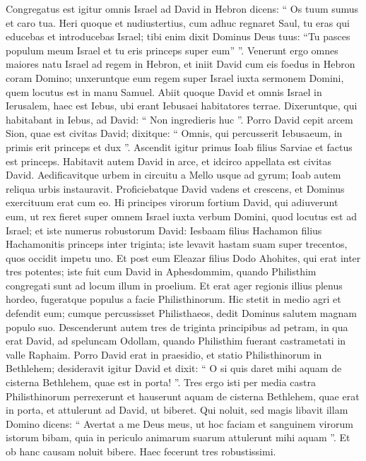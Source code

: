 \begin{biblechapter}
\begin{biblechapter}
\begin{biblechapter}
\begin{biblechapter}
\begin{biblechapter}
\begin{biblechapter}
\begin{biblechapter}
\begin{biblechapter}
\begin{biblechapter}
\begin{biblechapter}
\begin{biblechapter}
\verse Congregatus est igitur omnis Israel ad David in Hebron dicens: “ Os tuum sumus et caro tua. 
\verse Heri quoque et nudiustertius, cum adhuc regnaret Saul, tu eras qui educebas et introducebas Israel; tibi enim dixit Dominus Deus tuus: “Tu pasces populum meum Israel et tu eris princeps super eum” ”. 
\verse Venerunt ergo omnes maiores natu Israel ad regem in Hebron, et iniit David cum eis foedus in Hebron coram Domino; unxeruntque eum regem super Israel iuxta sermonem Domini, quem locutus est in manu Samuel.
 \verse Abiit quoque David et omnis Israel in Ierusalem, haec est Iebus, ubi erant Iebusaei habitatores terrae. 
\verse Dixeruntque, qui habitabant in Iebus, ad David: “ Non ingredieris huc ”. Porro David cepit arcem Sion, quae est civitas David; 
\verse dixitque: “ Omnis, qui percusserit Iebusaeum, in primis erit princeps et dux ”. Ascendit igitur primus Ioab filius Sarviae et factus est princeps. 
\verse Habitavit autem David in arce, et idcirco appellata est civitas David. 
\verse Aedificavitque urbem in circuitu a Mello usque ad gyrum; Ioab autem reliqua urbis instauravit. 
\verse Proficiebatque David vadens et crescens, et Dominus exercituum erat cum eo.
 \verse Hi principes virorum fortium David, qui adiuverunt eum, ut rex fieret super omnem Israel iuxta verbum Domini, quod locutus est ad Israel; 
\verse et iste numerus robustorum David: Iesbaam filius Hachamon filius Hachamonitis princeps inter triginta; iste levavit hastam suam super trecentos, quos occidit impetu uno. 
\verse Et post eum Eleazar filius Dodo Ahohites, qui erat inter tres potentes; 
\verse iste fuit cum David in Aphesdommim, quando Philisthim congregati sunt ad locum illum in proelium. Et erat ager regionis illius plenus hordeo, fugeratque populus a facie Philisthinorum. 
\verse Hic stetit in medio agri et defendit eum; cumque percussisset Philisthaeos, dedit Dominus salutem magnam populo suo.
 \verse Descenderunt autem tres de triginta principibus ad petram, in qua erat David, ad speluncam Odollam, quando Philisthim fuerant castrametati in valle Raphaim. 
\verse Porro David erat in praesidio, et statio Philisthinorum in Bethlehem; 
 \verse desideravit igitur David et dixit: “ O si quis daret mihi aquam de cisterna Bethlehem, quae est in porta! ”. 
\verse Tres ergo isti per media castra Philisthinorum perrexerunt et hauserunt aquam de cisterna Bethlehem, quae erat in porta, et attulerunt ad David, ut biberet. Qui noluit, sed magis libavit illam Domino 
\verse dicens: “ Avertat a me Deus meus, ut hoc faciam et sanguinem virorum istorum bibam, quia in periculo animarum suarum attulerunt mihi aquam ”. Et ob hanc causam noluit bibere. Haec fecerunt tres robustissimi.

\end{biblechapter}
\end{biblechapter}
\end{biblechapter}
\end{biblechapter}
\end{biblechapter}
\end{biblechapter}
\end{biblechapter}
\end{biblechapter}
\end{biblechapter}
\end{biblechapter}
\end{biblechapter}
